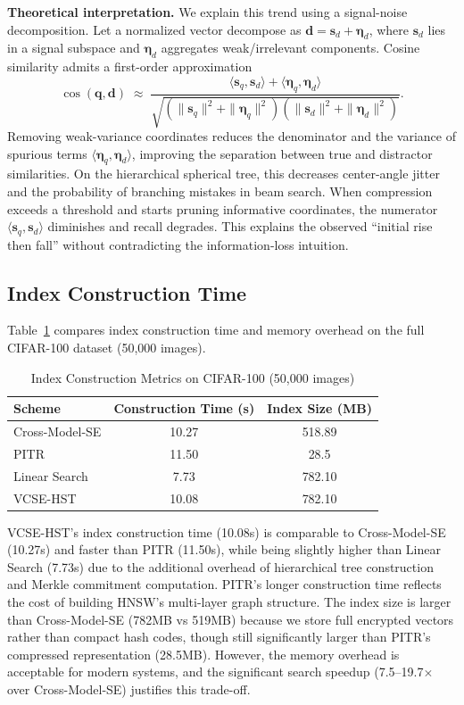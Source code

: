 \documentclass[journal]{IEEEtran}
\begin{document}
\textbf{Theoretical interpretation.}\label{sec:compression_theory}
We explain this trend using a signal-noise decomposition. Let a normalized vector decompose as $\mathbf{d}=\mathbf{s}_d+\boldsymbol{\eta}_d$, where $\mathbf{s}_d$ lies in a signal subspace and $\boldsymbol{\eta}_d$ aggregates weak/irrelevant components. Cosine similarity admits a first-order approximation
\[
\cos(\mathbf{q},\mathbf{d})\;\approx\;\frac{\langle\mathbf{s}_q,\mathbf{s}_d\rangle+\langle\boldsymbol{\eta}_q,\boldsymbol{\eta}_d\rangle}{\sqrt{(\|\mathbf{s}_q\|^2+\|\boldsymbol{\eta}_q\|^2)(\|\mathbf{s}_d\|^2+\|\boldsymbol{\eta}_d\|^2)}}.
\]
Removing weak-variance coordinates reduces the denominator and the variance of spurious terms $\langle\boldsymbol{\eta}_q,\boldsymbol{\eta}_d\rangle$, improving the separation between true and distractor similarities. On the hierarchical spherical tree, this decreases center-angle jitter and the probability of branching mistakes in beam search. When compression exceeds a threshold and starts pruning informative coordinates, the numerator $\langle\mathbf{s}_q,\mathbf{s}_d\rangle$ diminishes and recall degrades. This explains the observed ``initial rise then fall'' without contradicting the information-loss intuition.

\subsection{Index Construction Time}

Table~\ref{tab:index_construction} compares index construction time and memory overhead on the full CIFAR-100 dataset (50{,}000 images).

\begin{table}[!t]
\centering
\caption{Index Construction Metrics on CIFAR-100 (50{,}000 images)}
\label{tab:index_construction}
\begin{tabular}{lcc}
\toprule
\textbf{Scheme} & \textbf{Construction Time} (s) & \textbf{Index Size} (MB) \\
\midrule
Cross-Model-SE & 10.27 & 518.89 \\
PITR & 11.50 & 28.5 \\
Linear Search & 7.73 & 782.10 \\
VCSE-HST & 10.08 & 782.10 \\
\bottomrule
\end{tabular}
\end{table}

VCSE-HST's index construction time (10.08s) is comparable to Cross-Model-SE (10.27s) and faster than PITR (11.50s), while being slightly higher than Linear Search (7.73s) due to the additional overhead of hierarchical tree construction and Merkle commitment computation. PITR's longer construction time reflects the cost of building HNSW's multi-layer graph structure. The index size is larger than Cross-Model-SE (782MB vs 519MB) because we store full encrypted vectors rather than compact hash codes, though still significantly larger than PITR's compressed representation (28.5MB). However, the memory overhead is acceptable for modern systems, and the significant search speedup (7.5--19.7$\times$ over Cross-Model-SE) justifies this trade-off.
\end{document}
